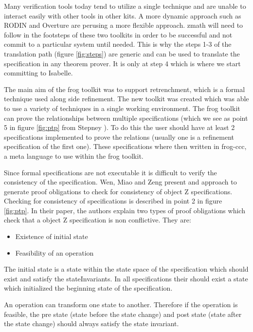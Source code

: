 Many verification tools today tend to utilize a single technique and are unable
to interact easily with other tools in other kits. A more dynamic approach such
as RODIN \cite{Jones05j} and Overture \cite{overture} are perusing a more
flexible approach. \gls{zmath} will need to follow in the footsteps of these two
toolkits in order to be successful and not commit to a particular system until
needed. This is why the steps 1-3 of the translation path (figure
\ref{fig:steps}) are generic and can be used to translate the specification in
any theorem prover. It is only at step 4 which is where we start committing to
Isabelle.

The main aim of the frog toolkit was to support retrenchment, which is a formal
technique used along side refinement. The new toolkit was created which was
able to use a variety of techniques in a single working environment. The frog
toolkit can prove the relationships between multiple specifications (which we
see as point 5 in figure \ref{fig:ptp} from Stepney \cite{stepney1998tale}). To
do this the user should have at least 2 specifications implemented to prove the
relations (usually one is a refinement specification of the first one). These
specifications where then written in frog-ccc, a meta language to use within the
frog toolkit.

Since formal specifications are not executable it is difficult to verify the
consistency of the specification. Wen, Miao and Zeng
\cite{DBLP:conf/icsea/WenMZ06} present and approach to generate proof
obligations to check for consistency of object Z specifications. Checking for
consistency of specifications is described in point 2 in figure \ref{fig:ptp}.
In their paper, the authors explain two types of proof obligations which check
that a object Z specification is non conflictive. They are:

\begin{itemize}
\item Existence of initial state

\item Feasibility of an operation
\end{itemize}

The initial state is a state within the state space of the specification which
should exist and satisfy the stateInvariants. In all specifications their should
exist a state which initialized the beginning state of the specification.

An operation can transform one state to another. Therefore if the operation is
feasible, the pre state (state before the state change) and post state (state
after the state change) should always satisfy the state invariant. 

